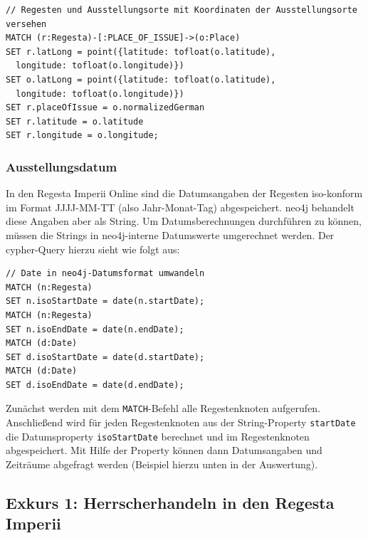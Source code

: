 \begin{verbatim}
// Regesten und Ausstellungsorte mit Koordinaten der Ausstellungsorte versehen
MATCH (r:Regesta)-[:PLACE_OF_ISSUE]->(o:Place)
SET r.latLong = point({latitude: tofloat(o.latitude),
  longitude: tofloat(o.longitude)})
SET o.latLong = point({latitude: tofloat(o.latitude),
  longitude: tofloat(o.longitude)})
SET r.placeOfIssue = o.normalizedGerman
SET r.latitude = o.latitude
SET r.longitude = o.longitude;
\end{verbatim}

\hypertarget{ausstellungsdatum}{%
\subsubsection{Ausstellungsdatum}\label{ausstellungsdatum}}

In den Regesta Imperii Online sind die Datumsangaben der Regesten
iso-konform im Format JJJJ-MM-TT (also Jahr-Monat-Tag) abgespeichert.
neo4j behandelt diese Angaben aber als String. Um Datumsberechnungen
durchführen zu können, müssen die Strings in neo4j-interne Datumswerte
umgerechnet werden. Der cypher-Query hierzu sieht wie folgt aus:

\begin{verbatim}
// Date in neo4j-Datumsformat umwandeln
MATCH (n:Regesta)
SET n.isoStartDate = date(n.startDate);
MATCH (n:Regesta)
SET n.isoEndDate = date(n.endDate);
MATCH (d:Date)
SET d.isoStartDate = date(d.startDate);
MATCH (d:Date)
SET d.isoEndDate = date(d.endDate);
\end{verbatim}

Zunächst werden mit dem \texttt{MATCH}-Befehl alle Regestenknoten
aufgerufen. Anschließend wird für jeden Regestenknoten aus der
String-Property \texttt{startDate} die Datumsproperty
\texttt{isoStartDate} berechnet und im Regestenknoten abgespeichert. Mit
Hilfe der Property können dann Datumsangaben und Zeiträume abgefragt
werden (Beispiel hierzu unten in der Auswertung).

\hypertarget{exkurs-1-herrscherhandeln-in-den-regesta-imperii}{%
\subsection{Exkurs 1: Herrscherhandeln in den Regesta
Imperii}\label{exkurs-1-herrscherhandeln-in-den-regesta-imperii}}

